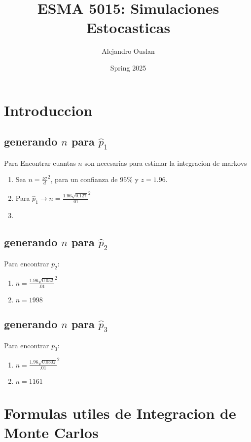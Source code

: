 \documentclass[10pt, oneside]{article}
\title{ESMA 5015: Simulaciones Estocasticas}
\author{Alejandro Ouslan}
\date{Spring 2025}
\begin{document}
\maketitle
\tableofcontents

\vspace{.25in}

\section{Introduccion}

\subsection{generando $n$ para $\hat{p}_1$}
Para Encontrar cuantas $n$ son necesarias para estimar la integracion de markovs
\begin{enumerate}
	\item Sea $n= \frac{z \sigma}{d}^2$, para un confianza de $95\%$ y $z=1.96$.
	\item Para $\hat{p}_1 \rightarrow n = \frac{1.96 \sqrt{0.127}}{.01}^2$
	\item
\end{enumerate}

\subsection{generando $n$ para $\hat{p}_2$}

Para encontrar $p_2$:

\begin{enumerate}
	\item $n= \frac{1.96 \sqrt{0.052}}{.01}^2$
	\item $n= 1998$
\end{enumerate}

\subsection{generando $n$ para $\hat{p}_3$}

Para encontrar $p_3$:
\begin{enumerate}
	\item $n= \frac{1.96 \sqrt{0.0302}}{.01}^2$
	\item $n= 1161$
\end{enumerate}

\section{Formulas utiles de Integracion de Monte Carlos}
\end{document}
